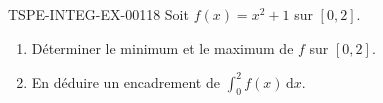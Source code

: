 \begin{exercice}{TSPE-INTEG-EX-001}{1}{8}
Soit $f(x) = x^2+1$ sur $[0,2]$.
\begin{enumerate}
  \item Déterminer le minimum et le maximum de $f$ sur $[0,2]$.
  \item En déduire un encadrement de $\displaystyle\int_0^2 f(x)\,\mathrm{d}x$.
\end{enumerate}
\end{exercice}
